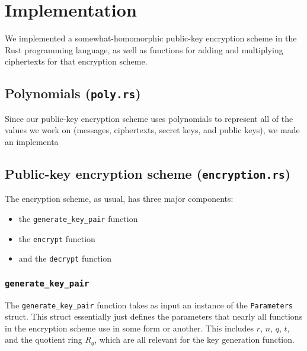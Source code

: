 \documentclass{article}
\begin{document}
\section{Implementation}

We implemented a somewhat-homomorphic public-key encryption scheme in the Rust programming language, as well as functions for adding and multiplying ciphertexts for that encryption scheme.

\subsection{Polynomials (\lstinline{poly.rs})}

Since our public-key encryption scheme uses polynomials to represent all of the values we work on (messages, ciphertexts, secret keys, and public keys), we made an implementa

\subsection{Public-key encryption scheme (\lstinline{encryption.rs})}

The encryption scheme, as usual, has three major components:

\begin{itemize}
  \item the \lstinline{generate_key_pair} function
  \item the \lstinline{encrypt} function
  \item and the \lstinline{decrypt} function
\end{itemize}

\subsubsection{\lstinline{generate_key_pair}}

The \lstinline{generate_key_pair} function takes as input an instance of the \lstinline{Parameters} struct.
This struct essentially just defines the parameters that nearly all functions in the encryption scheme use in some form or another.
This includes $r$, $n$, $q$, $t$, and the quotient ring $R_q$, which are all relevant for the key generation function.
\end{document}
